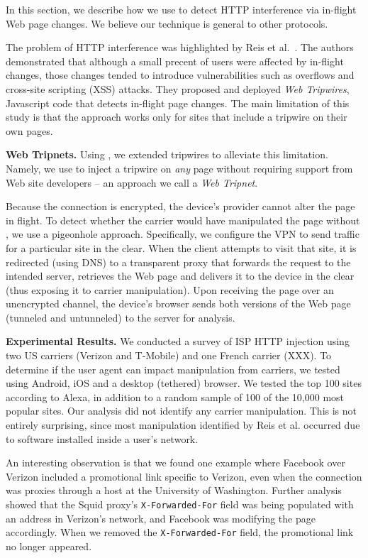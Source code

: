 In this section, we describe how we use \meddle to detect HTTP interference via 
in-flight Web page changes. We believe our technique 
is general to other protocols. 

The problem of HTTP interference was highlighted 
by Reis et al.~\cite{reis:tripwires}. The authors demonstrated that although a small 
precent of users were affected by in-flight changes, those changes tended to introduce 
vulnerabilities such as overflows and cross-site scripting (XSS) attacks. They proposed and deployed 
\emph{Web Tripwires}, Javascript code that detects in-flight page changes. The main 
limitation of this study is that the approach works only for sites that include a tripwire on their 
own pages.

\noindent\textbf{Web Tripnets.} Using \meddle, we extended tripwires to alleviate this 
limitation. Namely, we use \meddle to inject a tripwire on \emph{any} page without requiring 
support from Web site developers -- an approach we call a \emph{Web Tripnet}.

Because the \meddle connection is encrypted, the device's 
provider cannot alter the page in flight. To detect whether the carrier would have manipulated the 
page without \meddle, we use a pigeonhole approach. Specifically, we configure the VPN to send 
traffic for a particular site in the clear. When the client attempts to visit that site, it is  
redirected (using DNS) to a transparent proxy that forwards the request to the intended server, 
retrieves the Web page and delivers it to the device in the clear (thus exposing it to carrier manipulation). 
Upon receiving the page over an unencrypted channel, the device's browser sends both 
versions of the Web page (tunneled and untunneled) to the \meddle server for analysis. 

\noindent\textbf{Experimental Results.} We conducted a survey of ISP HTTP injection using two US carriers (Verizon and T-Mobile) 
and one French carrier (XXX). To determine if the user agent can impact manipulation from 
carriers, we tested using Android, iOS and a desktop (tethered) browser. We tested the top 
100 sites according to Alexa, in addition to a random sample of 100 of the 10,000 most popular 
sites. Our analysis did not identify any carrier manipulation. This is not entirely surprising, 
since most manipulation identified by Reis et al. occurred due to software installed inside 
a user's network.

An interesting observation is that 
we found one example where Facebook over Verizon included a promotional link specific to 
Verizon, even when the connection was proxies through a host at the University of Washington. 
Further analysis showed that the Squid proxy's {\tt X-Forwarded-For} field was being populated 
with an address in Verizon's network, and Facebook was modifying the page accordingly. When 
we removed the {\tt X-Forwarded-For} field, the promotional link no longer appeared. 

